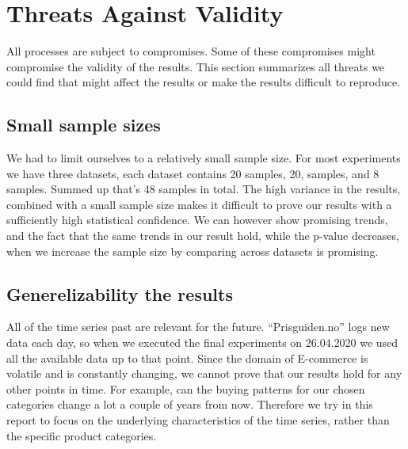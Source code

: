 \section{Threats Against Validity}
\label{section:Discussion:Threats}
All processes are subject to compromises. Some of these compromises might compromise the validity of
the results. This section summarizes all threats we could find that might affect the results or make
the results difficult to reproduce.

\subsection{Small sample sizes}
We had to limit ourselves to a relatively small sample size. For most experiments we have
three datasets, each dataset contains 20 samples, 20, samples, and 8 samples.
Summed up that's 48 samples in total. The high variance in the results, combined with a small sample size
makes it difficult to prove our results with a sufficiently high statistical confidence.
We can however show promising trends, and the fact that the same trends in our result hold, while
the p-value decreases, when
we increase the sample size by comparing across datasets is promising.




\subsection{Generelizability the results}
All of the time series past are relevant for the future. ``Prisguiden.no'' logs new data each day,
so when we executed the final experiments on 26.04.2020 we used all the available data up to that point.
Since the domain of E-commerce is volatile and is constantly changing, we cannot prove that our
results hold for any other points in time. For example, can the buying patterns for our chosen categories
change a lot a couple of years from now.
Therefore we try in this report to focus on the underlying characteristics of the time series, rather than
the specific product categories.


